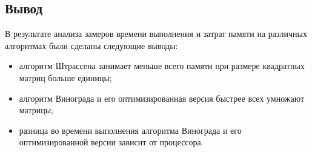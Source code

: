 \subsection{Вывод}

В результате анализа замеров времени выполнения и затрат памяти на различных алгоритмах были сделаны следующие выводы:

\begin{itemize}
	\item алгоритм Штрассена занимает меньше всего памяти при размере квадратных матриц больше единицы;
	\item алгоритм Винограда и его оптимизированная версия быстрее всех умножают матрицы;
	\item разница во времени выполнения алгоритма Винограда и его оптимизированной версии зависит от процессора.
\end{itemize}